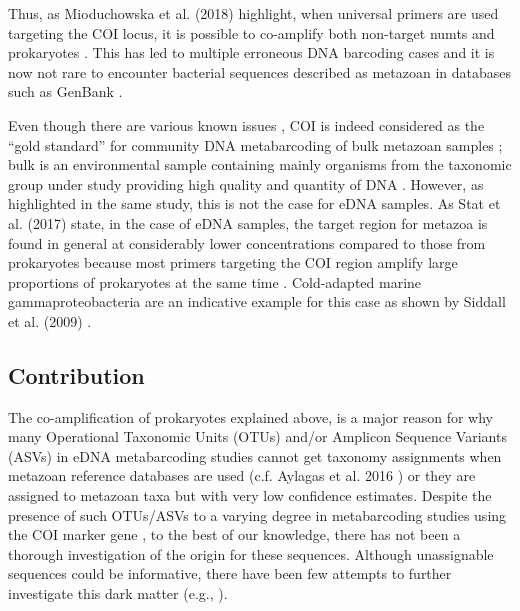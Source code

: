    Thus, as Mioduchowska et al. (2018) \citep{mioduchowska2018instances} highlight, when universal primers are used targeting the COI locus, it is possible to co-amplify both non-target numts and prokaryotes \citep{siddall2009barcoding}. This has led to multiple erroneous DNA barcoding cases and it is now not rare to encounter bacterial sequences described as metazoan in databases such as GenBank \citep{mioduchowska2018instances}.

   Even though there are various known issues \citep{deagle2014dna}, COI is indeed considered as the “gold standard” for community DNA metabarcoding of bulk metazoan samples \citep{andujar2018coi}; 
   bulk is an environmental sample containing mainly organisms from the taxonomic group under study providing high quality and quantity of DNA \citep{taberletanalysis}. 
   However, as highlighted in the same study, this is not the case for eDNA samples. 
   As Stat et al. (2017) \citep{stat2017ecosystem} state, in the case of eDNA samples, the target region for metazoa is found in general at considerably lower concentrations compared to those from prokaryotes because most primers targeting the COI region amplify large proportions of prokaryotes at the same time \citep{yang2013testing, yang2014using, collins2019non}. 
   Cold-adapted marine gammaproteobacteria are an indicative example for this case as shown by Siddall et al. (2009) \citep{siddall2009barcoding}.



   \subsection{Contribution}
   \label{sec:darn-contribution}

   The co-amplification of prokaryotes explained above, is a major reason for why many Operational Taxonomic Units (OTUs) and/or Amplicon Sequence Variants (ASVs) in eDNA metabarcoding studies cannot get taxonomy assignments when metazoan reference databases are used (c.f. Aylagas et al. 2016 \citep{aylagas2016benchmarking}) or they are assigned to metazoan taxa but with very low confidence estimates. 
   Despite the presence of such OTUs/ASVs to a varying degree in metabarcoding studies using the COI marker gene \citep{siddall2009barcoding}, to the best of our knowledge, there has not been a thorough investigation of the origin for these sequences. 
   Although unassignable sequences could be informative, there have been few attempts to further investigate this dark matter (e.g., \citep{sinniger2016worldwide, haenel2017ngs}).
   
